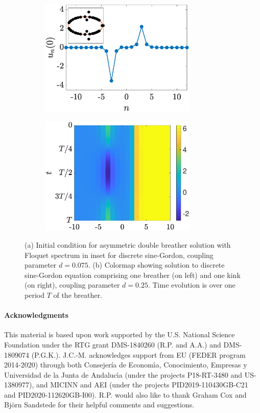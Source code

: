 \documentclass[12pt,reqno]{amsart}
\theoremstyle{definition}
\begin{document}
\begin{figure}
	\begin{center}
	\begin{subfigure}{0.45\linewidth}
		\caption{}
		\includegraphics[width=7.5cm]{images/doubleasymm.eps} 
		\label{fig:brka} 
	\end{subfigure}
	\begin{subfigure}{0.45\linewidth}
		\caption{}
		\includegraphics[width=7.5cm]{images/brk1colormap.eps} 
		\label{fig:brkb} 
	\end{subfigure}
	\end{center}
	\caption{(a) Initial condition for asymmetric double breather solution with Floquet spectrum in inset for discrete sine-Gordon, coupling parameter $d = 0.075$. (b) Colormap showing solution to discrete sine-Gordon equation comprising one breather (on left) and one kink (on right), coupling parameter $d = 0.25$. Time evolution is over one period $T$ of the breather.}
	\label{fig:brk}
\end{figure}

\vspace{0.5cm}

\paragraph{\textbf{Acknowledgments}}

This material is based upon work supported by the U.S. National Science Foundation under the RTG grant DMS-1840260 (R.P. and A.A.) and DMS-1809074 (P.G.K.). J.C.-M. acknowledges support from EU (FEDER program 2014-2020) through both Consejería de Econom\'{\i}a, Conocimiento, Empresas y Universidad de la Junta de Andaluc\'{\i}a (under the projects P18-RT-3480 and US-1380977), and MICINN and AEI (under the projects PID2019-110430GB-C21 and PID2020-112620GB-I00). R.P. would also like to thank Graham Cox and Bj\"orn Sandstede for their helpful comments and suggestions.
\end{document}
